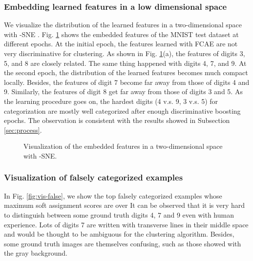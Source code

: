 \documentclass[preprint,12pt]{elsarticle}
\begin{document}
\subsubsection{Embedding learned features in a low dimensional space}

We visualize the distribution of the learned features in a two-dimensional space with -SNE \cite{Maaten2008tSNE}.
Fig. \ref{fig:vis-tsne} shows the embedded features of the MNIST test dataset at different epochs.
At the initial epoch, the features learned with FCAE are not very discriminative for clustering.
As shown in Fig. \ref{fig:vis-tsne}(a), the features of digits 3, 5, and 8 are closely related.
The same thing happened with digits 4, 7, and 9. At the second epoch, the distribution of the learned features
becomes much compact locally. Besides, the features of digit 7 become far away from those of digits 4 and 9.
Similarly, the features of digit 8 get far away from those of digits 3 and 5. As the learning procedure goes on,
the hardest digits (4 v.s. 9, 3 v.s. 5) for categorization are mostly well categorized after enough discriminative
boosting epochs. The observation is consistent with the results showed in Subsection \ref{sec:process}.

\begin{figure}[!htb]
\centering
{}
\caption{Visualization of the embedded features in a two-dimensional space with -SNE.}
\label{fig:vis-tsne}
\end{figure}


\subsubsection{Visualization of falsely categorized examples}

In Fig. \ref{fig:vis-false}, we show the top  falsely categorized examples whose maximum soft assignment scores
are over  It can be observed that it is very hard to distinguish between some ground truth digits 4, 7 and 9
even with human experience. Lots of digits 7 are written with transverse lines in their middle space and would be
thought to be ambiguous for the clustering algorithm. Besides, some ground truth images are themselves confusing,
such as those showed with the gray background.
\end{document}

